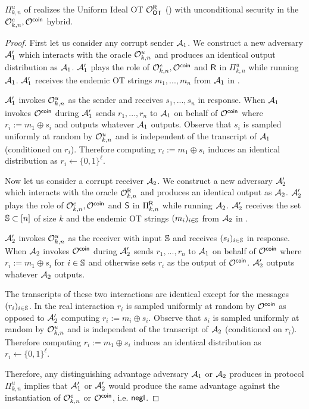 \begin{lemma}
	$\Pi^{u}_{k,n}$ of  realizes the Uniform Ideal OT $\mathcal{O}_{\mathsf{OT}}^{\mathsf{R}}$ () with unconditional security in the $\mathcal{O}^{e}_{k,n},\mathcal{O}^{\mathsf{coin}}$ hybrid.
\end{lemma}
\begin{proof}
	First let us consider any corrupt sender $\mathcal{A}_1$. We construct a new adversary $\mathcal{A}_1'$ which interacts with the oracle $\mathcal{O}^{u}_{k,n}$ and produces an identical output distribution as $\mathcal{A}_1$.  $\mathcal{A}_1'$ plays the role of $\mathcal{O}^{e}_{k,n},\mathcal{O}^{\mathsf{coin}}$ and $\mathsf{R}$ in $\Pi^{u}_{k,n}$ while running $\mathcal{A}_1$. $\mathcal{A}_1'$ receives the endemic OT strings $m_1,...,m_n$ from $\mathcal{A}_1$ in .
	
	
	$\mathcal{A}_1'$ invokes $\mathcal{O}^{u}_{k,n}$ as the sender and receives $s_1,...,s_n$ in response. When $\mathcal{A}_1$ invokes $\mathcal{O}^{\mathsf{coin}}$ during  $\mathcal{A}_1'$ sends $r_1,...,r_n$ to $\mathcal{A}_1$ on behalf of $\mathcal{O}^{\mathsf{coin}}$ where $r_i:=m_1\oplus s_i$ and outputs whatever $\mathcal{A}_1$ outputs. Observe that $s_i$ is sampled uniformly at random by $\mathcal{O}^{u}_{k,n}$ and is independent of the transcript of $\mathcal{A}_1$ (conditioned on $r_i$). Therefore computing $r_i:=m_1\oplus s_i$ induces an identical distribution as $r_i\gets\{0,1\}^\ell$.
	
	Now let us consider a corrupt receiver $\mathcal{A}_2$. We construct a new adversary $\mathcal{A}_2'$ which interacts with the oracle $\mathcal{O}^{\mathsf{R}}_{k,n}$ and produces an identical output as $\mathcal{A}_2$. $\mathcal{A}_2'$ plays the role of $\mathcal{O}^{e}_{k,n},\mathcal{O}^{\mathsf{coin}}$ and $\mathsf{S}$ in $\Pi^{\mathsf{R}}_{k,n}$ while running $\mathcal{A}_2$. $\mathcal{A}_2'$ receives the set $\mathsf{\mathbb S}\subset[n]$ of size $k$ and the endemic OT strings $(m_i)_{i\in \mathsf{\mathbb S}}$ from $\mathcal{A}_2$ in . 
	
	
	$\mathcal{A}_2'$ invokes  $\mathcal{O}^{u}_{k,n}$ as the receiver with input $\mathsf{\mathbb S}$ and receives $(s_i)_{i\in\mathsf{\mathbb S}}$ in response. When $\mathcal{A}_2$ invokes $\mathcal{O}^{\mathsf{coin}}$ during  $\mathcal{A}_2'$ sends $r_1,...,r_n$ to $\mathcal{A}_1$ on behalf of $\mathcal{O}^{\mathsf{coin}}$ where $r_i:=m_1\oplus s_i$ for $i\in \mathsf{\mathbb S}$ and otherwise sets $r_i$ as the output of $\mathcal{O}^\mathsf{coin}$. $\mathcal{A}_2'$ outputs whatever $\mathcal{A}_2$ outputs.
	
	The transcripts of these two interactions are identical except for the messages $(r_i)_{i\in \mathsf{\mathbb S}}$. In the real interaction $r_i$ is sampled uniformly at random by $\mathcal{O}^{\mathsf{coin}}$ as opposed to $\mathcal{A}_2'$ computing $r_i:=m_i\oplus s_i$. Observe that $s_i$ is sampled uniformly at random by $\mathcal{O}^{u}_{k,n}$ and is independent of the transcript of $\mathcal{A}_2$ (conditioned on $r_i$). Therefore computing $r_i:=m_1\oplus s_i$ induces an identical distribution as $r_i\gets\{0,1\}^\ell$.

	Therefore, any distinguishing advantage adversary $\mathcal{A}_1$ or $\mathcal{A}_2$ produces in protocol $\Pi^{u}_{k,n}$ implies that $\mathcal{A}_1'$ or $\mathcal{A}_2'$ would produce the same advantage against the instantiation of $\mathcal{O}^{e}_{k,n}$ or $\mathcal{O}^\mathsf{coin}$, i.e. $\mathsf{negl}$.
	
\end{proof}
